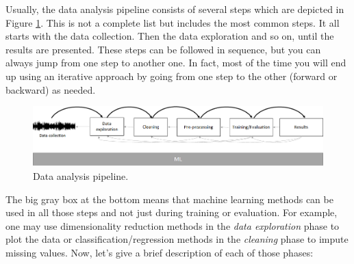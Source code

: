 \documentclass[
  11pt,
]{krantz}
\begin{document}
Usually, the data analysis pipeline consists of several steps which are depicted in Figure \ref{fig:pipeline}. This is not a complete list but includes the most common steps. It all starts with the data collection. Then the data exploration and so on, until the results are presented. These steps can be followed in sequence, but you can always jump from one step to another one. In fact, most of the time you will end up using an iterative approach by going from one step to the other (forward or backward) as needed.

\begin{figure}

{\centering \includegraphics[width=1\linewidth]{images/pipeline} 

}

\caption{Data analysis pipeline.}\label{fig:pipeline}
\end{figure}

The big gray box at the bottom means that machine learning methods can be used in all those steps and not just during training or evaluation. For example, one may use dimensionality reduction methods in the \emph{data exploration} phase to plot the data or classification/regression methods in the \emph{cleaning} phase to impute missing values. Now, let's give a brief description of each of those phases:
\end{document}
